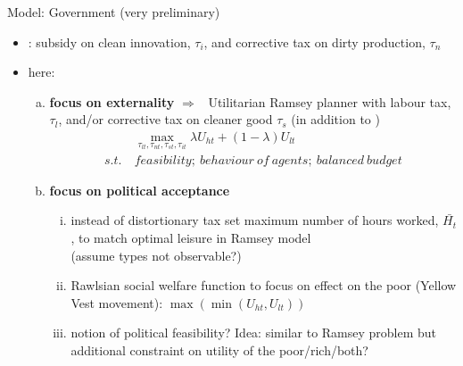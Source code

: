 \documentclass[11pt,aspectratio=169]{beamer}
\newcommand{\ar}{$\Rightarrow$ \ }
\begin{document}
\begin{frame}{Model: Government (very preliminary)}
	\vspace{-2mm}
	\begin{itemize}
\item 
\cite{Acemoglu2012TheChange}: subsidy on clean innovation, $\tau_i$, and corrective tax on dirty production, $\tau_n$
\item here:

\begin{enumerate}[a)]
	\item \textbf{focus on externality} \ar Utilitarian Ramsey planner with  labour tax, $\tau_l$, and/or corrective tax on cleaner good $\tau_s$ (in addition to \cite{Acemoglu2012TheChange})
	\vspace{-3mm}
	\begin{align*}
	&\underset{\tau_{lt}, \tau_{nt}, \tau_{st}, \tau_{it}}{\max} \lambda U_{ht}+(1-\lambda)U_{lt}\\
	s.t.\ & feasibility;\ behaviour\  of\  agents; \  balanced\ budget
	\end{align*}
	\vspace{-5mm}
	\pause
	\item \textbf{focus on political acceptance}
	\begin{enumerate}[i)]
		\item<+-> instead of distortionary tax set maximum number of hours worked,  $\bar{H_t}$, to match optimal leisure in Ramsey model\\ (assume types not observable?)
		\item<+-> Rawlsian social welfare function to focus on effect on the poor (Yellow Vest movement): $\max(\min(U_{ht}, U_{lt}))$ 
		\item<+-> \alert{notion of political feasibility?} Idea: similar to Ramsey problem but additional constraint on utility of the poor/rich/both?
	\end{enumerate}
	
\end{enumerate}

	\end{itemize}
\end{frame}
\end{document}
